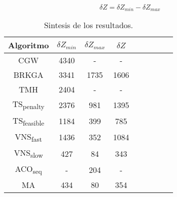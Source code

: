 \begin{equation} \label{eq:DeltaZ}
\delta Z = \delta Z_{min} - \delta Z_{max}
\end{equation}

\bigskip

\begin{table}[!htbp]
\begin{center}
\begin{tabular}{ |c|c|c|c|c|c|c|c|c| } 
\hline
Algoritmo & $\delta Z_{min}$ & $\delta Z_{max}$ & $\delta Z$  \\
\hline
CGW & 4340 & - & -  \\
BRKGA & 3341 & 1735 & 1606  \\
TMH & 2404 & - & -  \\
TS\textsubscript{penalty} & 2376 & 981 & 1395  \\
TS\textsubscript{feasible} & 1184 & 399 & 785  \\
VNS\textsubscript{fast} & 1436 & 352 & 1084  \\
VNS\textsubscript{slow} & 427 & 84 & 343  \\
ACO\textsubscript{seq} & - & 204 & -  \\
MA & 434 & 80 & 354  \\
\hline
\end{tabular}
\end{center}
\caption{Sintesis de los resultados.}
\label{tab:resultadosSintesis}
\end{table}

\bigskip




